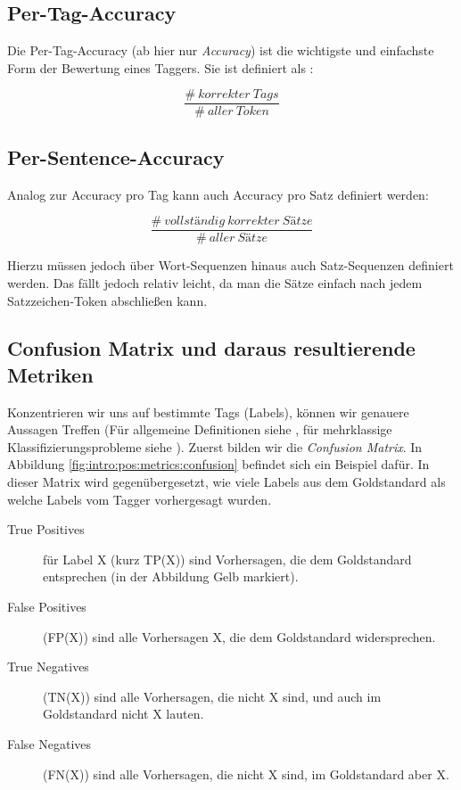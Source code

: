 \subsection{Per-Tag-Accuracy}

Die Per-Tag-Accuracy (ab hier nur \textit{Accuracy}) ist die wichtigste und einfachste Form der Bewertung eines Taggers. Sie ist definiert als \cite{Rao} :

\[ \frac{\# \: korrekter \:  Tags}{\# \: aller \:  Token} \]

\subsection{Per-Sentence-Accuracy}

Analog zur Accuracy pro Tag kann auch Accuracy pro Satz definiert werden:

\[ \frac{\# \: vollständig \: korrekter \:  Sätze}{\# \: aller \:  Sätze} \]

Hierzu müssen jedoch über Wort-Sequenzen hinaus auch Satz-Sequenzen definiert werden. Das fällt jedoch relativ leicht, da man die Sätze einfach nach jedem Satzzeichen-Token abschließen kann.

\subsection{Confusion Matrix und daraus resultierende Metriken}
Konzentrieren wir uns auf bestimmte Tags (Labels), können wir genauere Aussagen Treffen
(Für allgemeine Definitionen siehe \cite{Rao}, für mehrklassige Klassifizierungsprobleme siehe \cite{Web:rxnlp}). Zuerst bilden wir die \textit{Confusion Matrix}. In Abbildung \ref{fig:intro:pos:metrics:confusion} befindet sich ein Beispiel dafür. In dieser Matrix wird gegenübergesetzt, wie viele Labels aus dem Goldstandard als welche Labels vom Tagger vorhergesagt wurden.
\begin{description}

\item[True Positives] für Label X (kurz TP(X)) sind Vorhersagen, die dem Goldstandard entsprechen (in der Abbildung Gelb markiert).
\item[False Positives] (FP(X)) sind alle Vorhersagen X, die dem Goldstandard widersprechen.
\item[True Negatives] (TN(X)) sind alle Vorhersagen, die nicht X sind, und auch im Goldstandard nicht X lauten.
\item[False Negatives] (FN(X)) sind alle Vorhersagen, die nicht X sind, im Goldstandard aber X.
\end{description}

